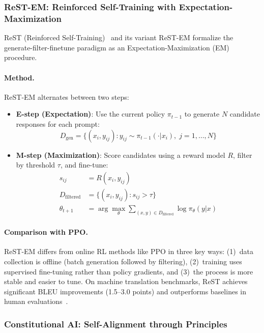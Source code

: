 \subsubsection{ReST-EM: Reinforced Self-Training with Expectation-Maximization}
\label{sec:rest-em}

ReST (Reinforced Self-Training)~\citep{gulcehre2023rest} and its variant ReST-EM formalize the generate-filter-finetune paradigm as an Expectation-Maximization (EM) procedure.

\paragraph{Method.}
ReST-EM alternates between two steps:

\begin{itemize}
    \item \textbf{E-step (Expectation)}: Use the current policy $\pi_{t-1}$ to generate $N$ candidate responses for each prompt:
    \begin{equation}
        D_{\text{gen}} = \{(x_i, y_{ij}) : y_{ij} \sim \pi_{t-1}(\cdot|x_i), \; j=1,\ldots,N\}
    \end{equation}
    \item \textbf{M-step (Maximization)}: Score candidates using a reward model $R$, filter by threshold $\tau$, and fine-tune:
    \begin{align}
        s_{ij} &= R(x_i, y_{ij}) \\
        D_{\text{filtered}} &= \{(x_i, y_{ij}) : s_{ij} > \tau\} \\
        \theta_{t+1} &= \arg\max_\theta \sum_{(x,y) \in D_{\text{filtered}}} \log \pi_\theta(y|x)
    \end{align}
\end{itemize}

\paragraph{Comparison with PPO.}
ReST-EM differs from online RL methods like PPO in three key ways: (1)~data collection is offline (batch generation followed by filtering), (2)~training uses supervised fine-tuning rather than policy gradients, and (3)~the process is more stable and easier to tune. On machine translation benchmarks, ReST achieves significant BLEU improvements (1.5--3.0 points) and outperforms baselines in human evaluations~\citep{gulcehre2023rest}.

\subsubsection{Constitutional AI: Self-Alignment through Principles}
\label{sec:constitutional-ai}

